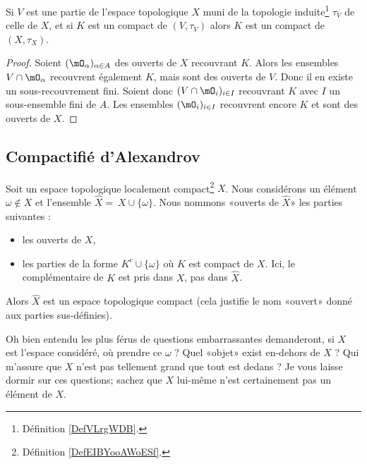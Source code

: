 \begin{proposition}     \label{PropGBZUooRKaOxy}
    Si \( V\) est une partie de l'espace topologique \( X\) muni de la topologie induite\footnote{Définition \ref{DefVLrgWDB}.} \( \tau_V\) de celle de \( X\), et si \( K\) est un compact de \( (V,\tau_V)\) alors \( K\) est un compact de \( (X,\tau_X)\).
\end{proposition}

\begin{proof}
    Soient \(   (\mO_\alpha)_{\alpha\in A}  \) des ouverts de \( X\) recouvrant \( K\). Alors les ensembles \( V\cap \mO_{\alpha}\) recouvrent également \( K\), mais sont des ouverts de \( V\). Donc il en existe un sous-recouvrement fini. Soient donc \( (V\cap\mO_i)_{i\in I}\) recouvrant \( K\) avec \( I\) un sous-ensemble fini de \( A\). Les ensembles \( (\mO_i)_{i\in I}\) recouvrent encore \( K\) et sont des ouverts de \( X\).
\end{proof}

\subsection{Compactifié d'Alexandrov}

\begin{propositionDef}       \label{PROPooHNOZooPSzKIN}
    Soit un espace topologique localement compact\footnote{Définition \ref{DefEIBYooAWoESf}.} \( X\). Nous considérons un élément \( \omega\notin X\) et l'ensemble \( \hat X =\ X\cup\{ \omega \}\). Nous nommons «ouverts de \( \hat X\)» les parties suivantes :
    \begin{itemize}
        \item les ouverts de \( X\),
        \item les parties de la forme \( K^c\cup\{ \omega \}\) où \( K\) est compact de \( X\). Ici, le complémentaire de \( K\) est pris dans \( X\), pas dans \( \hat X\).
    \end{itemize}
   Alors \( \hat X\) est un espace topologique compact (cela justifie le nom «ouvert» donné aux parties sus-définies).
\end{propositionDef}

Oh bien entendu les plus férus de questions embarrassantes demanderont, si \( X\) est l'espace considéré, où prendre ce \( \omega\) ? Quel «objet» exist en-dehors de \( X\) ? Qui m'assure que \( X\) n'est pas tellement grand que tout est dedans ? Je vous laisse dormir sur ces questions; sachez que \( X\) lui-même n'est certainement pas un élément de \( X\).

